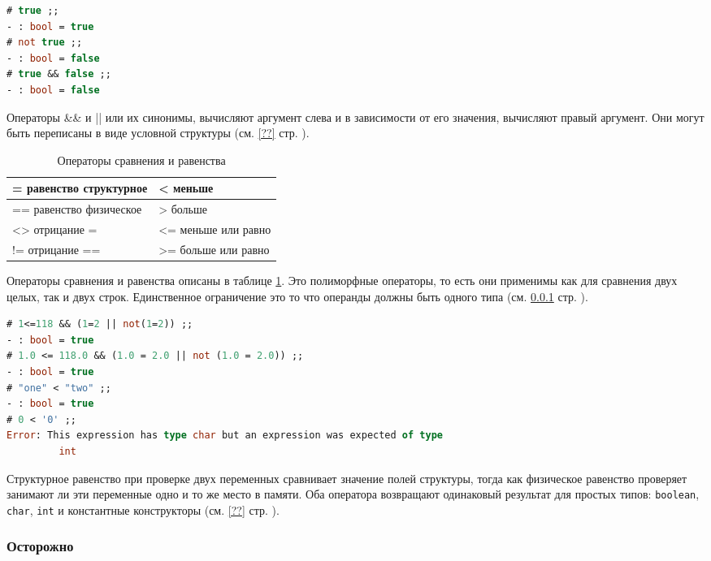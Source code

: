 \begin{lstlisting}[language=OCaml]
# true ;;
- : bool = true
# not true ;;
- : bool = false
# true && false ;;
- : bool = false
\end{lstlisting}

Операторы \&\& и || или их синонимы, вычисляют аргумент слева и в зависимости от
его значения, вычисляют правый аргумент. Они могут быть переписаны в виде
условной структуры (см. \ref{??} стр. \pageref{??}).

\begin{table}[hl]
\begin{center}
	\caption{Операторы сравнения и равенства}
	\begin{tabular}{|p{5cm}|p{5cm}|}
	\hline
	= равенство структурное & < меньше \\
	\hline
	== равенство физическое & > больше \\
	\hline
	<> отрицание = & <= меньше или равно \\
	\hline
	!= отрицание == & >= больше или равно \\
	\hline
	\end{tabular}
\end{center}
	\label{tbl:comparison_operations}
\end{table}

Операторы сравнения и равенства описаны в таблице
\ref{tbl:comparison_operations}. Это полиморфные операторы, то есть они
применимы как для сравнения двух целых, так и двух строк. Единственное
ограничение это то что операнды должны быть одного типа (см. \ref{} стр.
\pageref{}).

\begin{lstlisting}[language=OCaml]
# 1<=118 && (1=2 || not(1=2)) ;;
- : bool = true
# 1.0 <= 118.0 && (1.0 = 2.0 || not (1.0 = 2.0)) ;;
- : bool = true
# "one" < "two" ;;
- : bool = true
# 0 < '0' ;;
Error: This expression has type char but an expression was expected of type
         int
\end{lstlisting}

Структурное равенство при проверке двух переменных сравнивает значение полей
структуры, тогда как физическое равенство проверяет занимают ли эти переменные
одно и то же место в памяти. Оба оператора возвращают одинаковый результат для
простых типов: \texttt{boolean}, \texttt{char}, \texttt{int} и константные
конструкторы (см. \ref{??} стр. \pageref{??}).

\subsubsection{Осторожно}

